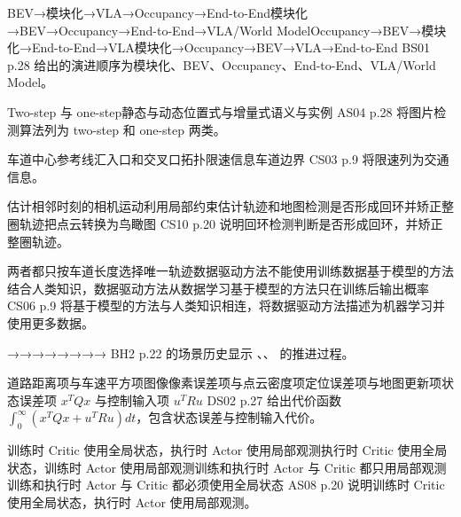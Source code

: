 
{BEV→模块化→VLA→Occupancy→End-to-End}{模块化→BEV→Occupancy→End-to-End→VLA/World Model}{Occupancy→BEV→模块化→End-to-End→VLA}{模块化→Occupancy→BEV→VLA→End-to-End}
{B}{S01 p.28 给出的演进顺序为模块化、BEV、Occupancy、End-to-End、VLA/World Model。}

{Two-step 与 one-step}{静态与动态}{位置式与增量式}{语义与实例}
{A}{S04 p.28 将图片检测算法列为 two-step 和 one-step 两类。}

{车道中心参考线}{汇入口和交叉口拓扑}{限速信息}{车道边界}
{C}{S03 p.9 将限速列为交通信息。}

{估计相邻时刻的相机运动}{利用局部约束估计轨迹和地图}{检测是否形成回环并矫正整圈轨迹}{把点云转换为鸟瞰图}
{C}{S10 p.20 说明回环检测判断是否形成回环，并矫正整圈轨迹。}

{两者都只按车道长度选择唯一轨迹}{数据驱动方法不能使用训练数据}{基于模型的方法结合人类知识，数据驱动方法从数据学习}{基于模型的方法只在训练后输出概率}
{C}{S06 p.9 将基于模型的方法与人类知识相连，将数据驱动方法描述为机器学习并使用更多数据。}

{→→}{→→}{→→}{→→}
{B}{H2 p.22 的场景历史显示 、、 的推进过程。}

{道路距离项与车速平方项}{图像像素误差项与点云密度项}{定位误差项与地图更新项}{状态误差项 $x^TQx$ 与控制输入项 $u^TRu$}
{D}{S02 p.27 给出代价函数 $\int_0^\infty(x^TQx+u^TRu)dt$，包含状态误差与控制输入代价。}

{训练时 Critic 使用全局状态，执行时 Actor 使用局部观测}{执行时 Critic 使用全局状态，训练时 Actor 使用局部观测}{训练和执行时 Actor 与 Critic 都只用局部观测}{训练和执行时 Actor 与 Critic 都必须使用全局状态}
{A}{S08 p.20 说明训练时 Critic 使用全局状态，执行时 Actor 使用局部观测。}

